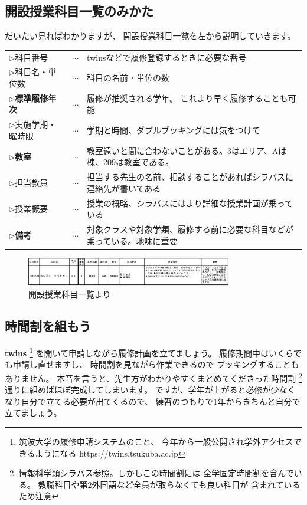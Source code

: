 \documentclass[a4j]{jsarticle}
\newcommand{\note}[1]{{\color{red} #1}}
\newcommand{\RA}{{\color{red}\large RED ALERT}}
\newcommand{\bold}[1]{{\bfseries #1}}
\renewcommand{\note}[1]{}\renewcommand{\RA}{}
\begin{document}
\subsection{開設授業科目一覧のみかた}
だいたい見ればわかりますが、
開設授業科目一覧を左から説明していきます。
\vspace{-3mm}
\begin{table}[H]
\begin{tabular}{lcl}
$\rhd$科目番号&$\cdots$&twinsなどで履修登録するときに必要な番号\\
$\rhd$科目名・単位数&$\cdots$&科目の名前・単位の数\\
$\rhd$\bold{標準履修年次}&$\cdots$&履修が推奨される学年。
これより早く履修することも可能\\
$\rhd$実施学期・曜時限&$\cdots$&学期と時間、ダブルブッキングには気をつけて\\
$\rhd$\bold{教室}&$\cdots$&教室遠いと間に合わないことがある。3はエリア、Aは棟、209は教室である。\\
$\rhd$担当教員&$\cdots$&担当する先生の名前、相談することがあればシラバスに連絡先が書いてある\\
$\rhd$授業概要&$\cdots$&授業の概略、シラバスにはより詳細な授業計画が乗っている\\
$\rhd$\bold{備考}&$\cdots$&対象クラスや対象学類、履修する前に必要な科目などが乗っている。地味に重要
\end{tabular}
\end{table}
\vspace{-5mm}
\begin{figure}[H]
\begin{center}
\includegraphics[width=0.8\textwidth,clip]{pic/kaisetu/online.eps}
\vspace{-2mm}
\caption{開設授業科目一覧より}
\end{center}
\end{figure}
\vspace{-8mm}

\subsection{時間割を組もう}
\bold{twins}
\footnote{筑波大学の履修申請システムのこと、
今年から一般公開され学外アクセスできるようになる
https://twins.tsukuba.ac.jp\note{たぶん合ってる}}
を開いて申請しながら履修計画を立てましょう。
履修期間中はいくらでも申請し直せますし、
時間割を見ながら作業できるので
ブッキングすることもありません。
本音を言うと、先生方がわかりやすくまとめてくださった時間割
\footnote{情報科学類シラバス参照。しかしこの時間割には
全学固定時間割を含んでいる。
教職科目や第2外国語など全員が取らなくても良い科目が
含まれているため注意}
通りに組めばほぼ完成してしまいます。
ですが、学年が上がると必修が少なくなり自分で立てる必要が出てくるので、
練習のつもりで1年からきちんと自分で立てましょう。
\end{document}
